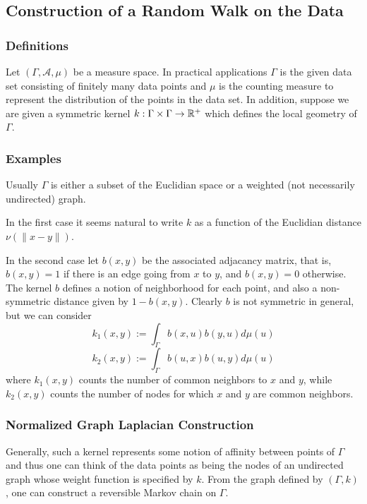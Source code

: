 \subsection{Construction of a Random Walk on the Data}
\subsubsection{Definitions}
Let $(\Gamma, \mathcal{A}, \mu)$ be a measure space. In practical applications $\Gamma$ is the given data set consisting of finitely many data points and $\mu$ is the counting measure to represent the distribution of the points in the data set. In addition, suppose we are given a symmetric kernel $k: \Gamma \times \Gamma \rightarrow \mathbb{R}^+$ which defines the local geometry of $\Gamma$.

\subsubsection{Examples}
Usually $\Gamma$ is either a subset of the Euclidian space or a weighted (not necessarily undirected) graph.

In the first case it seems natural to write $k$ as a function of the Euclidian distance $\nu(\|x-y\|)$.

In the second case let $b(x,y)$ be the associated adjacancy matrix, that is, $b(x,y) = 1$ if there is an edge going from $x$ to $y$, and $b(x,y) = 0$ otherwise. The kernel $b$ defines a notion of neighborhood for each point, and also a non-symmetric distance given by $1-b(x,y)$. Clearly $b$ is not symmetric in general, but we can consider
\begin{equation*}
k_1(x,y):=\int_\Gamma b(x,u)b(y,u)d\mu(u)
\end{equation*}
\begin{equation*}
k_2(x,y):=\int_\Gamma b(u,x)b(u,y)d\mu(u)
\end{equation*}
where $k_1(x,y)$ counts the number of common neighbors to $x$ and $y$, while $k_2(x,y)$ counts the number of nodes for which $x$ and $y$ are common neighbors.

\subsubsection{Normalized Graph Laplacian Construction}
Generally, such a kernel represents some notion of affinity between points of $\Gamma$ and thus one can think of the data points as being the nodes of an undirected graph whose weight function is specified by $k$. From the graph defined by $(\Gamma, k)$, one can construct a reversible Markov chain on $\Gamma$.

